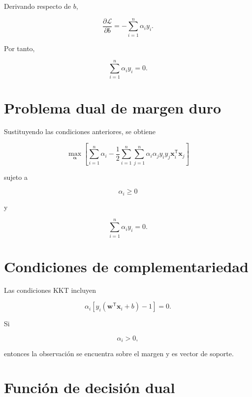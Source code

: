 \documentclass[
  spanish,
  10.5pt,
  letterpaper,
  DIV=11,
  numbers=noendperiod,
  oneside,
  open=any]{scrreprt}
\theoremstyle{definition}
\theoremstyle{definition}
\theoremstyle{plain}
\theoremstyle{remark}
\begin{document}

Derivando respecto de \(b\),

\[
\frac{\partial\mathcal{L}}{\partial b}
=
-
\sum_{i=1}^{n}
\alpha_i y_i.
\]

Por tanto,

\[
\sum_{i=1}^{n}
\alpha_i y_i=0.
\]

\section*{Problema dual de margen
duro}\label{problema-dual-de-margen-duro}


Sustituyendo las condiciones anteriores, se obtiene

\[
\max_{\boldsymbol{\alpha}}
\left[
\sum_{i=1}^{n}\alpha_i
-
\frac{1}{2}
\sum_{i=1}^{n}
\sum_{j=1}^{n}
\alpha_i\alpha_j
y_i y_j
\mathbf{x}_i^{\mathsf T}\mathbf{x}_j
\right]
\]

sujeto a

\[
\alpha_i\geq 0
\]

y

\[
\sum_{i=1}^{n}\alpha_i y_i=0.
\]

\section*{Condiciones de
complementariedad}\label{condiciones-de-complementariedad}


Las condiciones KKT incluyen

\[
\alpha_i
\left[
y_i
\left(
\mathbf{w}^{\mathsf T}\mathbf{x}_i+b
\right)
-1
\right]
=
0.
\]

Si

\[
\alpha_i>0,
\]

entonces la observación se encuentra sobre el margen y es vector de
soporte.

\section*{Función de decisión
dual}\label{funciuxf3n-de-decisiuxf3n-dual}

\end{document}
